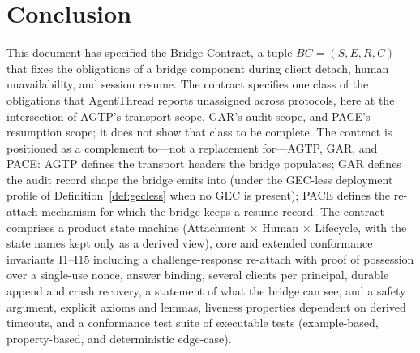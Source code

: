 \section{Conclusion}

This document has specified the Bridge Contract, a tuple
$BC = (S, E, R, C)$ that fixes the obligations of a bridge component
during client detach, human unavailability, and session
resume. The contract specifies one class of the obligations that
AgentThread \cite{zheng2026formal} reports unassigned across protocols,
here at the intersection of AGTP's transport scope, GAR's audit scope,
and PACE's resumption scope; it does not show that class to be complete. The contract is
positioned as a complement to---not a replacement for---AGTP, GAR,
and PACE: AGTP defines the transport headers the bridge populates;
GAR defines the audit record shape the bridge emits into (under the
GEC-less deployment profile of Definition~\ref{def:gecless} when no
GEC is present); PACE defines the re-attach mechanism for which the
bridge keeps a resume record. The contract comprises a
product state machine (Attachment $\times$ Human $\times$ Lifecycle, with
the state names kept only as a derived view), core and extended
conformance invariants I1--I15 including a challenge-response re-attach
with proof of possession over a single-use nonce, answer binding, several
clients per principal, durable append and crash recovery, a statement of
what the bridge can see, and a safety argument, explicit axioms and lemmas,
liveness properties dependent on derived timeouts, and a conformance test
suite of executable tests (example-based, property-based, and
deterministic edge-case).

